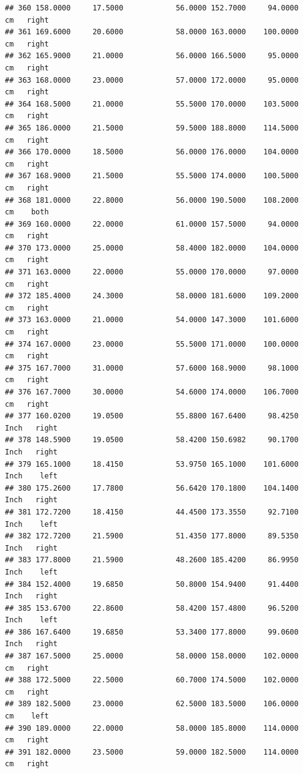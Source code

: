 \documentclass[]{article}
\begin{document}
\begin{verbatim}
## 360 158.0000     17.5000            56.0000 152.7000     94.0000     cm   right
## 361 169.6000     20.6000            58.0000 163.0000    100.0000     cm   right
## 362 165.9000     21.0000            56.0000 166.5000     95.0000     cm   right
## 363 168.0000     23.0000            57.0000 172.0000     95.0000     cm   right
## 364 168.5000     21.0000            55.5000 170.0000    103.5000     cm   right
## 365 186.0000     21.5000            59.5000 188.8000    114.5000     cm   right
## 366 170.0000     18.5000            56.0000 176.0000    104.0000     cm   right
## 367 168.9000     21.5000            55.5000 174.0000    100.5000     cm   right
## 368 181.0000     22.8000            56.0000 190.5000    108.2000     cm    both
## 369 160.0000     22.0000            61.0000 157.5000     94.0000     cm   right
## 370 173.0000     25.0000            58.4000 182.0000    104.0000     cm   right
## 371 163.0000     22.0000            55.0000 170.0000     97.0000     cm   right
## 372 185.4000     24.3000            58.0000 181.6000    109.2000     cm   right
## 373 163.0000     21.0000            54.0000 147.3000    101.6000     cm   right
## 374 167.0000     23.0000            55.5000 171.0000    100.0000     cm   right
## 375 167.7000     31.0000            57.6000 168.9000     98.1000     cm   right
## 376 167.7000     30.0000            54.6000 174.0000    106.7000     cm   right
## 377 160.0200     19.0500            55.8800 167.6400     98.4250   Inch   right
## 378 148.5900     19.0500            58.4200 150.6982     90.1700   Inch   right
## 379 165.1000     18.4150            53.9750 165.1000    101.6000   Inch    left
## 380 175.2600     17.7800            56.6420 170.1800    104.1400   Inch   right
## 381 172.7200     18.4150            44.4500 173.3550     92.7100   Inch    left
## 382 172.7200     21.5900            51.4350 177.8000     89.5350   Inch   right
## 383 177.8000     21.5900            48.2600 185.4200     86.9950   Inch    left
## 384 152.4000     19.6850            50.8000 154.9400     91.4400   Inch   right
## 385 153.6700     22.8600            58.4200 157.4800     96.5200   Inch    left
## 386 167.6400     19.6850            53.3400 177.8000     99.0600   Inch   right
## 387 167.5000     25.0000            58.0000 158.0000    102.0000     cm   right
## 388 172.5000     22.5000            60.7000 174.5000    102.0000     cm   right
## 389 182.5000     23.0000            62.5000 183.5000    106.0000     cm    left
## 390 189.0000     22.0000            58.0000 185.8000    114.0000     cm   right
## 391 182.0000     23.5000            59.0000 182.5000    114.0000     cm   right

\end{verbatim}
\end{document}
